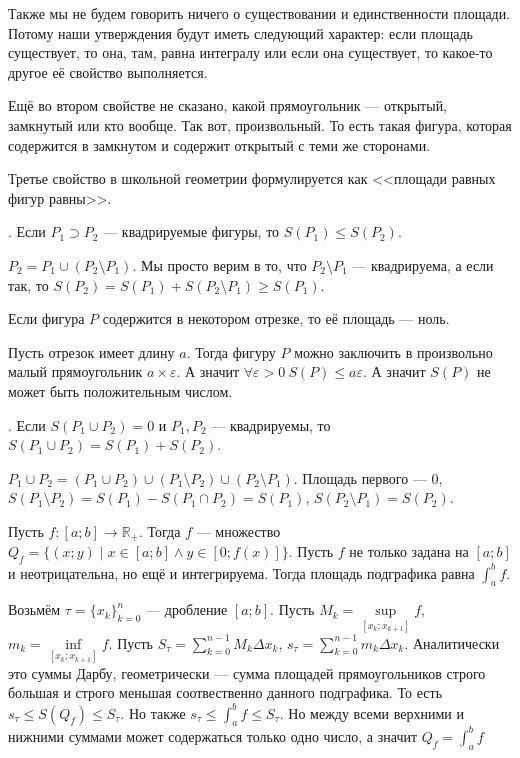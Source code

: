 \documentclass{article}
\begin{document}
\begin{itemize}
\begin{Comment}
            Также мы не будем говорить ничего о существовании и единственности площади. Потому наши утверждения будут иметь следующий характер: если площадь существует, то она, там, равна интегралу или если она существует, то какое-то другое её свойство выполняется.
        \end{Comment}
        \begin{Comment}
            Ещё во втором свойстве не сказано, какой прямоугольник --- открытый, замкнутый или кто вообще. Так вот, произвольный. То есть такая фигура, которая содержится в замкнутом и содержит открытый с теми же сторонами.
        \end{Comment}
        \begin{Comment}
            Третье свойство в школьной геометрии формулируется как <<площади равных фигур равны>>.
        \end{Comment}
        \thm {}. Если $P_1\supset P_2$ --- квадрируемые фигуры, то $S(P_1)\leqslant S(P_2)$.
        \begin{Proof}
            $P_2=P_1\cup(P_2\setminus P_1)$. Мы просто верим в то, что $P_2\setminus P_1$ --- квадрируема, а если так, то $S(P_2)=S(P_1)+S(P_2\setminus P_1)\geqslant S(P_1)$.
        \end{Proof}
        \thm Если фигура $P$ содержится в некотором отрезке, то её площадь --- ноль.
        \begin{Proof}
            Пусть отрезок имеет длину $a$. Тогда фигуру $P$ можно заключить в произвольно малый прямоугольник $a\times\varepsilon$. А значит $\forall\varepsilon>0~S(P)\leqslant a\varepsilon$. А значит $S(P)$ не может быть положительным числом.
        \end{Proof}
        \thm {}. Если $S(P_1\cup P_2)=0$ и $P_1,P_2$ --- квадрируемы, то $S(P_1\cup P_2)=S(P_1)+S(P_2)$.
        \begin{Proof}
            $P_1\cup P_2=(P_1\cup P_2)\cup(P_1\setminus P_2)\cup(P_2\setminus P_1)$. Площадь первого --- 0, $S(P_1\setminus P_2)=S(P_1)-S(P_1\cap P_2)=S(P_1)$, $S(P_2\setminus P_1)=S(P_2)$.
        \end{Proof}
        \dfn Пусть $f\colon[a;b]\to\mathbb R_+$. Тогда  $f$ --- множество $Q_f=\{(x;y)\mid x\in[a;b]\land y\in[0;f(x)]\}$.
        \thm Пусть $f$ не только задана на $[a;b]$ и неотрицательна, но ещё и интегрируема. Тогда площадь подграфика равна $\int_a^bf$.
        \begin{Proof}
            Возьмём $\tau=\{x_k\}_{k=0}^n$ --- дробление $[a;b]$. Пусть $M_k=\sup\limits_{[x_k;x_{k+1}]}f$, $m_k=\inf\limits_{[x_k;x_{k+1}]}f$. Пусть $S_\tau=\sum\limits_{k=0}^{n-1}M_k\Delta x_k$, $s_\tau=\sum\limits_{k=0}^{n-1}m_k\Delta x_k$. Аналитически это суммы Дарбу, геометрически --- сумма площадей прямоугольников строго большая и строго меньшая соотвественно данного подграфика. То есть $s_\tau\leqslant S(Q_f)\leqslant S_\tau$. Но также $s_\tau\leqslant\int_a^bf\leqslant S_\tau$. Но между всеми верхними и нижними суммами может содержаться только одно число, а значит $Q_f=\int_a^bf$

\end{Proof}
\end{itemize}
\end{document}
